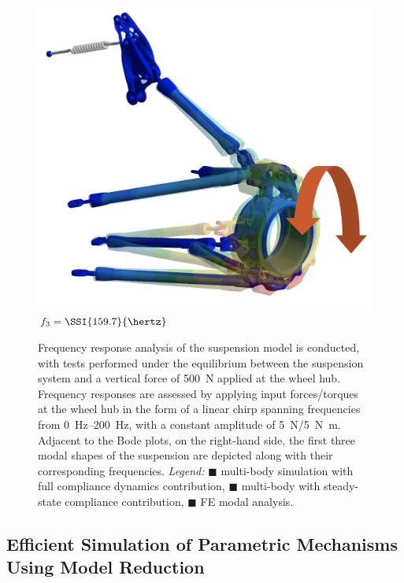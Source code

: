 \begin{figure}[!ht]
\begin{minipage}[c]{0.125\linewidth}
\begin{center}
      \includegraphics[width=1.0\linewidth]{./figures/chapter_5/mode3.png} \\ \small{$f_3 = \SSI{159.7}{\hertz}$} \\
    \end{center}
  \end{minipage}
  \caption{Frequency response analysis of the suspension model is conducted, with tests performed under the equilibrium between the suspension system and a vertical force of \SI{500}{\newton} applied at the wheel hub. Frequency responses are assessed by applying input forces/torques at the wheel hub in the form of a linear chirp spanning frequencies from \SIrange{0}{200}{\hertz}, with a constant amplitude of \SI{5}{\newton}/\SI{5}{\newton\meter}. Adjacent to the Bode plots, on the right-hand side, the first three modal shapes of the suspension are depicted along with their corresponding frequencies. \emph{Legend:} {\color{mycolor1}$\blacksquare$} \Simulink{} multi-body simulation with full compliance dynamics contribution, {\color{mycolor2}$\blacksquare$} \Simulink{} multi-body with steady-state compliance contribution, {\color{mycolor3}$\blacksquare$} \Ansys{} \ac{FE} modal analysis.}
  \label{chap5:fig:suspension_dynamic_results}
\end{figure}

\subsection{Efficient Simulation of Parametric Mechanisms Using Model Reduction}

